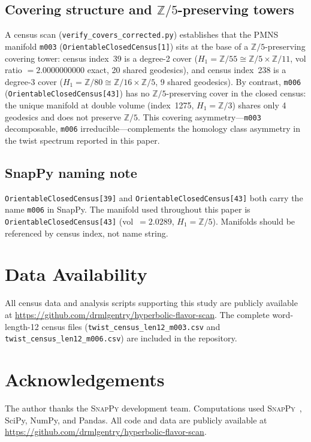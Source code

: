 \documentclass[12pt,a4paper]{article}
\newcommand{\mfld}[1]{\texttt{#1}}
\begin{document}
\subsection{Covering structure and $\mathbb{Z}/5$-preserving towers}
A census scan (\texttt{verify\_covers\_corrected.py}) establishes
that the PMNS manifold \mfld{m003} (\texttt{OrientableClosedCensus[1]})
sits at the base of a $\mathbb{Z}/5$-preserving covering tower:
census index~39 is a degree-2 cover
($H_1=\mathbb{Z}/55\cong\mathbb{Z}/5\times\mathbb{Z}/11$,
vol ratio $= 2.0000000000$ exact, 20 shared geodesics),
and census index~238 is a degree-3 cover
($H_1=\mathbb{Z}/80\cong\mathbb{Z}/16\times\mathbb{Z}/5$,
9 shared geodesics).
By contrast, \mfld{m006} (\texttt{OrientableClosedCensus[43]})
has no $\mathbb{Z}/5$-preserving cover in the closed census:
the unique manifold at double volume (index~1275, $H_1=\mathbb{Z}/3$)
shares only 4 geodesics and does not preserve $\mathbb{Z}/5$.
This covering asymmetry---\mfld{m003} decomposable,
\mfld{m006} irreducible---complements the homology class asymmetry
in the twist spectrum reported in this paper.

\subsection*{SnapPy naming note}
\texttt{OrientableClosedCensus[39]} and
\texttt{OrientableClosedCensus[43]} both carry the name \texttt{m006}
in SnapPy. The manifold used throughout this paper is
\texttt{OrientableClosedCensus[43]} (vol~$=2.0289$, $H_1=\mathbb{Z}/5$).
Manifolds should be referenced by census index, not name string.
\section*{Data Availability}
All census data and analysis scripts supporting this study are publicly
available at \url{https://github.com/drmlgentry/hyperbolic-flavor-scan}.
The complete word-length-12 census files (\texttt{twist\_census\_len12\_m003.csv}
and \texttt{twist\_census\_len12\_m006.csv}) are included in the repository.

\section*{Acknowledgements}
The author thanks the \textsc{SnapPy} development team.
Computations used \textsc{SnapPy}~\cite{SnapPy}, SciPy, NumPy, and Pandas.
All code and data are publicly available at
\url{https://github.com/drmlgentry/hyperbolic-flavor-scan}.
\end{document}
